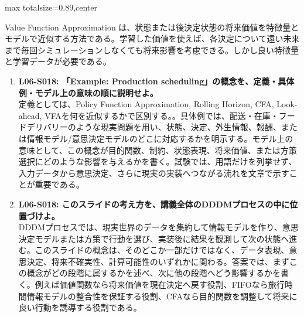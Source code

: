 \begin{minipage}[t]{0.58\textwidth}
\begin{adjustbox}{max totalsize={\textwidth}{0.89\textheight},center}
\begin{minipage}{\textwidth}
Value Function Approximation は、状態または後決定状態の将来価値を特徴量とモデルで近似する方法である。学習した価値を使えば、各決定について遠い未来まで毎回シミュレーションしなくても将来影響を考慮できる。しかし良い特徴量と学習データが必要である。\par{}\begin{enumerate}\item \textbf{L06-S018: 「Example: Production scheduling」の概念を、定義・具体例・モデル上の意味の順に説明せよ。}\\定義としては、Policy Function Approximation, Rolling Horizon, CFA, Look-ahead, VFAを何を近似するかで区別する。。具体例では、配送・在庫・フードデリバリーのような現実問題を用い、状態、決定、外生情報、報酬、または情報モデル/意思決定モデルのどこに対応するかを明示する。モデル上の意味として、この概念が目的関数、制約、状態表現、将来価値、または方策選択にどのような影響を与えるかを書く。試験では、用語だけを列挙せず、入力データから意思決定、さらに現実の実装へつながる流れを文章で示すことが重要である。\item \textbf{L06-S018: このスライドの考え方を、講義全体のDDDMプロセスの中に位置づけよ。}\\DDDMプロセスでは、現実世界のデータを集約して情報モデルを作り、意思決定モデルまたは方策で行動を選び、実装後に結果を観測して次の状態へ進む。このスライドの概念は、そのどこか一部だけではなく、データ表現、意思決定、将来不確実性、計算可能性のいずれかに関わる。答案では、まずこの概念がどの段階に属するかを述べ、次に他の段階へどう影響するかを書く。例えば価値関数なら将来価値を現在決定へ戻す役割、FIFOなら旅行時間情報モデルの整合性を保証する役割、CFAなら目的関数を調整して将来に良い行動を誘導する役割である。\end{enumerate}
\end{minipage}
\end{adjustbox}
\end{minipage}


